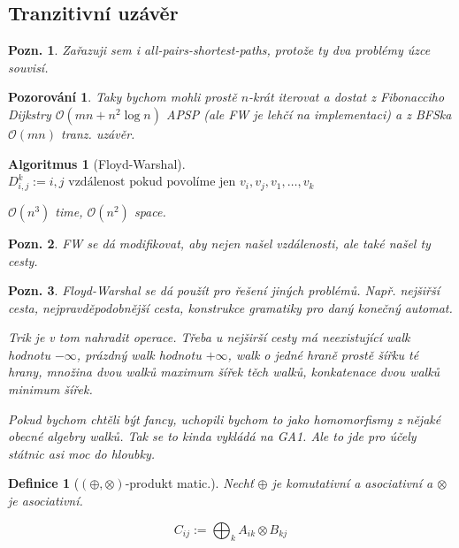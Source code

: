 \documentclass{article}
\theoremstyle{noparens}
\newtheorem*{alg}{Algoritmus}
\newtheorem*{pozor}{Pozorování}
\newtheorem*{definition}{Definice}
\theoremstyle{noparens-mys}
\theoremstyle{noparens-note}
\newtheorem*{note}{Pozn.}
\newcommand{\OO}{\mathcal{O}}
\begin{document}
\subsection{Tranzitivní uzávěr}

\begin{note}
    Zařazuji sem i all-pairs-shortest-paths, protože ty dva problémy úzce
    souvisí.
\end{note}


\begin{pozor}
    Taky bychom mohli prostě $n$-krát iterovat a dostat z Fibonacciho Dijkstry
    $\OO(mn + n^2 \log n)$ APSP (ale FW je lehčí na implementaci) a z BFSka
    $\OO(mn)$ tranz. uzávěr.
\end{pozor}

\begin{alg}[Floyd-Warshal]
    $D_{i,j}^k := \text{$i,j$ vzdálenost pokud povolíme jen }v_i, v_j, v_1,\hdots,v_k$

    $\OO(n^3)$ time, $\OO(n^2)$ space.
\end{alg}

\begin{note}
    FW se dá modifikovat, aby nejen našel vzdálenosti, ale také našel ty cesty.
\end{note}

\begin{note}
    Floyd-Warshal se dá použít pro řešení jiných problémů. Např. nejšiřší
    cesta, nejpravděpodobnější cesta, konstrukce gramatiky pro daný konečný
    automat.

    Trik je v tom nahradit operace. Třeba u nejširší cesty má neexistující walk
    hodnotu $-\infty$, prázdný walk hodnotu $+\infty$, walk o jedné hraně
    prostě šířku té hrany, množina dvou walků maximum šířek těch walků,
    konkatenace dvou walků minimum šířek.

    Pokud bychom chtěli být fancy, uchopili bychom to jako homomorfismy z
    nějaké obecné algebry walků. Tak se to kinda vykládá na GA1. Ale to jde pro
    účely státnic asi moc do hloubky.
\end{note}

\begin{definition}[$(\oplus, \otimes)$-produkt matic.]
    Nechť $\oplus$ je komutativní a asociativní a $\otimes$ je asociativní.

    $$C_{ij} := \bigoplus_k A_{ik} \otimes B_{kj}$$
\end{definition}
\end{document}
